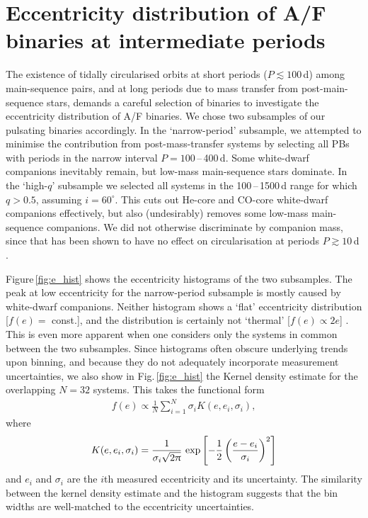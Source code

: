 \documentclass[a4paper,fleqn,usenatbib]{mnras}
\begin{document}


\section{Eccentricity distribution of A/F binaries at intermediate periods}
\label{sec:eccentricity}

The existence of tidally circularised orbits at short periods \mbox{($P\lesssim100$\,d)} among main-sequence pairs, and at long periods due to mass transfer from post-main-sequence stars, demands a careful selection of binaries to investigate the eccentricity distribution of A/F binaries. We chose two subsamples of our pulsating binaries accordingly. In the `narrow-period' subsample, we attempted to minimise the contribution from post-mass-transfer systems by selecting all PBs with periods in the narrow interval $P = 100$\,--\,400\,d. Some white-dwarf companions inevitably remain, but low-mass main-sequence stars dominate. In the `high-$q$' subsample we selected all systems in the 100\,--\,1500\,d range for which $q>0.5$, assuming $i=60^{\circ}$. This cuts out He-core and CO-core white-dwarf companions effectively, but also (undesirably) removes some low-mass main-sequence companions. We did not otherwise discriminate by companion mass, since that has been shown to have no effect on circularisation at periods $P \gtrsim 10$\,d \citep{vaneylenetal2016}.

Figure\,\ref{fig:e_hist} shows the eccentricity histograms of the two subsamples. The peak at low eccentricity for the narrow-period subsample is mostly caused by white-dwarf companions. Neither histogram shows a `flat' eccentricity distribution [$f(e) =$ const.], and the distribution is certainly not `thermal' [$f(e) \propto 2e$] \citep{ambartsumian1937,kroupa2008}. This is even more apparent when one considers only the systems in common between the two subsamples. Since histograms often obscure underlying trends upon binning, and because they do not adequately incorporate measurement uncertainties, we also show in Fig.\,\ref{fig:e_hist} the Kernel density estimate for the overlapping $N=32$ systems. This takes the functional form
\begin{eqnarray}
f(e) \propto \frac{1}{N}\sum_{i=1}^N \sigma_i K(e,e_i,\sigma_i),
\end{eqnarray}
where
\begin{eqnarray}
K(e,e_i,\sigma_i) = \frac{1}{\sigma_i \sqrt{2 \uppi}}~{\rm exp} \left[ -\frac{1}{2} \left(\frac{e - e_i}{\sigma_i}\right)^2 \right]
\end{eqnarray}
and $e_i$ and $\sigma_i$ are the $i$th measured eccentricity and its uncertainty. The similarity between the kernel density estimate and the histogram suggests that the bin widths are well-matched to the eccentricity uncertainties.
\end{document}
